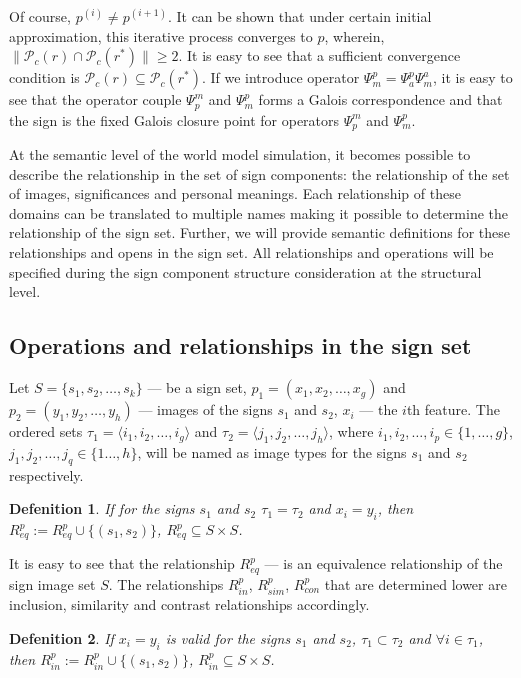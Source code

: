 \documentclass[12pt]{scrartcl}
\newtheorem{definition}{Defenition}
\begin{document}
	Of course, $p^{(i)}\not = p^{(i+1)}$. It can be shown that under certain initial approximation, this iterative process converges to $p$, wherein, $\|\mathcal P_c(r)\cap\mathcal P_c(r^*)\|\geq 2$. It is easy to see that a sufficient convergence condition is $\mathcal P_c(r)\subseteq\mathcal P_c(r^*)$. If we introduce operator $\Psi_m^p=\Psi_a^p\Psi_m^a$, it is easy to see that the operator couple $\Psi_p^m$ and $\Psi_m^p$ forms a Galois correspondence and that the sign is the fixed Galois closure point for operators $\Psi_p^m$ and $\Psi_m^p$.
	
	At the semantic level of the world model simulation, it becomes possible to describe the relationship in the set of sign components: the relationship of the set of images, significances and personal meanings. Each relationship of these domains can be translated to multiple names making it possible to determine the relationship of the sign set. Further, we will provide semantic definitions for these relationships and opens in the sign set. All relationships and operations will be specified during the sign component structure consideration at the structural level.
	
		
	\subsection{Operations and relationships in the sign set}
	Let $S=\{s_1,s_2,\dots,s_k\}$ --- be a sign set, $p_1=(x_1,x_2,\dots,x_g)$ and $p_2=(y_1,y_2,\dots,y_h)$ --- images of the signs $s_1$ and $s_2$, $x_i$ --- the $i$th feature. The ordered sets $\tau_1=\langle i_1,i_2,\dots,i_g\rangle$ and $\tau_2=\langle j_1,j_2,\dots,j_h\rangle$, where $i_1,i_2,\dots,i_p\in\{1,\dots,g\}$, $j_1,j_2,\dots,j_q\in\{1\dots,h\}$, will be named as image types for the signs $s_1$ and $s_2$ respectively.
		
	\begin{definition}
		If for the signs $s_1$ and $s_2$ $\tau_1=\tau_2$ and $x_i=y_i$, then $R^p_{eq}:=R^p_{eq}\cup\{(s_1,s_2)\}$, $R^p_{eq}\subseteq S\times S$.
	\end{definition}

	It is easy to see that the relationship $R^p_{eq}$ --- is an equivalence relationship of the sign image set $S$. The relationships $R^p_{in}$, $R^p_{sim}$, $R^p_{con}$ that are determined lower are inclusion, similarity and contrast relationships accordingly.
	
	\begin{definition}
		 If $x_i=y_i$ is valid for the signs  $s_1$ and $s_2$, $\tau_1\subset\tau_2$ and $\forall i\in\tau_1$, then $R^p_{in}:=R^p_{in}\cup\{(s_1,s_2)\}$, $R^p_{in}\subseteq S\times S$.
	\end{definition}
	
\end{document}
